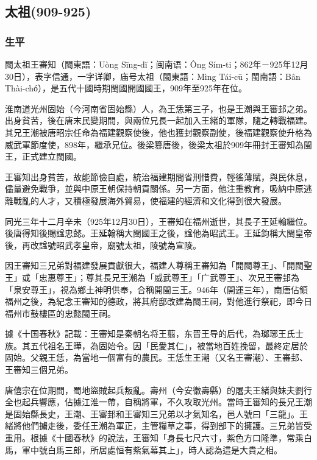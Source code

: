 
\subsection{太祖\tiny(909-925)}

\subsubsection{生平}

閩太祖王審知（閩東語：Uòng Sīng-dĭ；闽南语：Ông Sím-ti；862年－925年12月30日），表字信通，一字详卿，庙号太祖（閩東語：Mìng Tái-cū；閩南語：Bân Thài-chó͘），是五代十國時期閩國開國國王，909年至925年在位。

淮南道光州固始（今河南省固始縣）人，為王恁第三子，也是王潮與王審邽之弟。出身貧苦，後在唐末民變期間，與兩位兄長一起加入王緒的軍隊，隨之轉戰福建。其兄王潮被唐昭宗任命為福建觀察使後，他也獲封觀察副使，後福建觀察使升格為威武軍節度使，898年，繼承兄位。後梁篡唐後，後梁太祖於909年冊封王審知為閩王，正式建立閩國。

王審知出身貧苦，故能節儉自處，統治福建期間省刑惜費，輕徭薄賦，與民休息，儘量避免戰爭，並與中原王朝保持朝貢關係。另一方面，他注重教育，吸納中原逃離戰亂的人才，又積極發展海外貿易，使福建的經濟和文化得到很大發展。

同光三年十二月辛未（925年12月30日），王審知在福州逝世，其長子王延翰繼位。後唐得知後賜諡忠懿。王延翰稱大閩國王之後，諡他為昭武王。王延鈞稱大閩皇帝後，再改諡號昭武孝皇帝，廟號太祖，陵號為宣陵。

因王審知三兄弟對福建發展貢獻很大，福建人尊稱王審知為「開閩尊王」、「開閩聖王」或「忠惠尊王」；尊其長兄王潮為「威武尊王」「广武尊王」、次兄王審邽為「泉安尊王」，視為鄉土神明供奉，合稱開閩三王。946年（開運三年），南唐佔領福州之後，為紀念王審知的德政，將其府邸改建為閩王祠，對他進行祭祀，即今日福州市鼓樓區的忠懿閩王祠。

據《十国春秋》記載：王審知是秦朝名将王翦，东晋王导的后代，為瑯琊王氏士族。其五代祖名王曄，為固始令。因「民愛其仁」，被當地百姓挽留，最終定居於固始。父親王恁，為當地一個富有的農民。王恁生王潮（又名王審潮）、王審邽、王審知三個兄弟。

唐僖宗在位期間，蜀地盜賊起兵叛亂。壽州（今安徽壽縣）的屠夫王緒與妹夫劉行全也起兵響應，佔據江淮一帶，自稱將軍，不久攻取光州。當時王審知的長兄王潮是固始縣長史，王潮、王審邽和王審知三兄弟以才氣知名，邑人號曰「三龍」。王緒將他們擄走後，委任王潮為軍正，主管糧草之事，得到部下的擁護。三兄弟皆受重用。根據《十國春秋》的說法，王審知「身長七尺六寸，紫色方口隆準，常乘白馬，軍中號白馬三郎，所居處恒有紫氣幕其上」，時人認為這是大貴之相。

